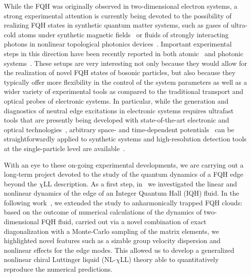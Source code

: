 \documentclass[twocolumn,pra,superscriptaddress,noshowpacs]{revtex4}
\begin{document}
While the FQH was originally observed in two-dimensional electron systems, a strong experimental attention is currently being devoted to the possibility of realizing FQH states in synthetic quantum matter systems, such as gases of ultra-cold atoms under synthetic magnetic fields~\cite{Cooper_2008,Bloch_RMP_2008,Cooper_RMP_2019,Goldman_RepProgPhys_2014} or fluids of strongly interacting photons in nonlinear topological photonics devices~\cite{Carusotto_NatPhys_2020,Carusotto_RMP_2013,Ozawa_RMP_2019}.
Important experimental steps in this direction have been recently reported in both atomic~\cite{Gemelke_2010,Fletcher_Science_2021,Tai_Nat_2017,Leonard_2022} and photonic systems~\cite{Schine_Nat_2016,Clark_Nat_2020,Roushan_NatPhys_2017}.
These setups are very interesting not only because they would allow for the realization
of novel FQH states of bosonic particles, but also because they typically offer more flexibility in the control of the system parameters as well as a wider variety of experimental tools as compared to the traditional transport and optical probes of electronic systems. In particular, while the  generation and diagnostics of neutral edge excitations in electronic systems requires ultrafast tools that are presently being developed with state-of-the-art electronic and optical technologies~\cite{Yusa_PRR_2022,Ashoori_PRB_1992}, arbitrary space- and time-dependent potentials~\cite{Gauthier2016} can be straightforwardly applied to synthetic systems and high-resolution detection tools at the single-particle level are available~\cite{Gross2021}.

With an eye to these on-going experimental developments, we are carrying out a long-term project devoted to the study of the quantum dynamics of a FQH edge beyond the $\chi$LL description. As a first step, in~\cite{Nardin_EPL_2020} we investigated the linear and nonlinear dynamics of the edge of an Integer Quantum Hall (IQH) fluid. In the following work~\cite{Nardin_PRA_2023}, we extended the study to anharmonically trapped FQH clouds: based on the outcome of numerical calculations of the dynamics of two-dimensional FQH fluid,
carried out via a novel combination of exact diagonalization with a Monte-Carlo sampling of the matrix elements, 
we highlighted novel features such as a sizable group velocity dispersion and nonlinear effects for the edge modes. This allowed us to develop a generalized nonlinear chiral Luttinger liquid (NL-$\chi$LL) theory able to quantitatively reproduce the numerical predictions.
\end{document}
